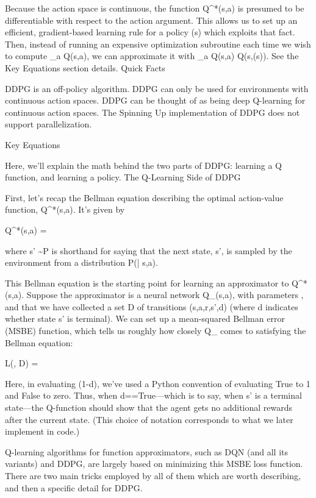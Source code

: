 Because the action space is continuous, the function Q^*(s,a) is presumed to be differentiable with respect to the action argument. This allows us to set up an efficient, gradient-based learning rule for a policy \mu(s) which exploits that fact. Then, instead of running an expensive optimization subroutine each time we wish to compute \max_a Q(s,a), we can approximate it with \max_a Q(s,a) \approx Q(s,\mu(s)). See the Key Equations section details.
Quick Facts

    DDPG is an off-policy algorithm.
    DDPG can only be used for environments with continuous action spaces.
    DDPG can be thought of as being deep Q-learning for continuous action spaces.
    The Spinning Up implementation of DDPG does not support parallelization.

Key Equations

Here, we'll explain the math behind the two parts of DDPG: learning a Q function, and learning a policy.
The Q-Learning Side of DDPG

First, let's recap the Bellman equation describing the optimal action-value function, Q^*(s,a). It's given by

Q^*(s,a) = 

where s' \sim P is shorthand for saying that the next state, s', is sampled by the environment from a distribution P(\cdot| s,a).

This Bellman equation is the starting point for learning an approximator to Q^*(s,a). Suppose the approximator is a neural network Q_{\phi}(s,a), with parameters \phi, and that we have collected a set {\mathcal D} of transitions (s,a,r,s',d) (where d indicates whether state s' is terminal). We can set up a mean-squared Bellman error (MSBE) function, which tells us roughly how closely Q_{\phi} comes to satisfying the Bellman equation:

L(\phi, {\mathcal D}) = 

Here, in evaluating (1-d), we've used a Python convention of evaluating True to 1 and False to zero. Thus, when d==True---which is to say, when s' is a terminal state---the Q-function should show that the agent gets no additional rewards after the current state. (This choice of notation corresponds to what we later implement in code.)

Q-learning algorithms for function approximators, such as DQN (and all its variants) and DDPG, are largely based on minimizing this MSBE loss function. There are two main tricks employed by all of them which are worth describing, and then a specific detail for DDPG.

